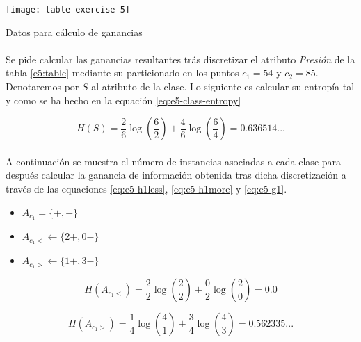 \documentclass[10pt, a4paper,spanish]{article}
\begin{document}
		\begin{table}[h]
			\begin{center}
				\texttt{[image: table-exercise-5]}
				\caption{Datos para cálculo de ganancias}
			\end{center}
			\label{e5:table}
		\end{table}

		\paragraph{}
		Se pide calcular las ganancias resultantes trás discretizar el atributo \emph{Presión} de la tabla \ref{e5:table} mediante su particionado en los puntos $c_1 = 54$ y $c_2 = 85$. Denotaremos por $S$ al atributo de la clase. Lo siguiente es calcular su entropía tal y como se ha hecho en la equación \eqref{eq:e5-class-entropy}

		\begin{equation}
			\label{eq:e5-class-entropy}
			H(S) = \frac{2}{6}\log(\frac{6}{2}) + \frac{4}{6}\log(\frac{6}{4}) = 0.636514...
		\end{equation}

		\paragraph{}
		A continuación se muestra el número de instancias asociadas a cada clase para después calcular la ganancia de información obtenida tras dicha discretización a través de las equaciones \eqref{eq:e5-h1less},  \eqref{eq:e5-h1more} y \eqref{eq:e5-g1}.

		\begin{itemize}
			\setlength\itemsep{0em}
			\item $A_{c_1} = \{ +, - \}$
			\item $A_{c_1 <} \leftarrow \{ 2+, 0- \}$
			\item $A_{c_1 >} \leftarrow \{ 1+, 3- \}$
		\end{itemize}

		\begin{equation}
			\label{eq:e5-h1less}
			H(A_{c_1 <}) = \frac{2}{2}\log(\frac{2}{2}) + \frac{0}{2}\log(\frac{2}{0}) = 0.0
		\end{equation}

		\begin{equation}
			\label{eq:e5-h1more}
			H(A_{c_1 >}) = \frac{1}{4}\log(\frac{4}{1}) + \frac{3}{4}\log(\frac{4}{3}) = 0.562335...
		\end{equation}
\end{document}
